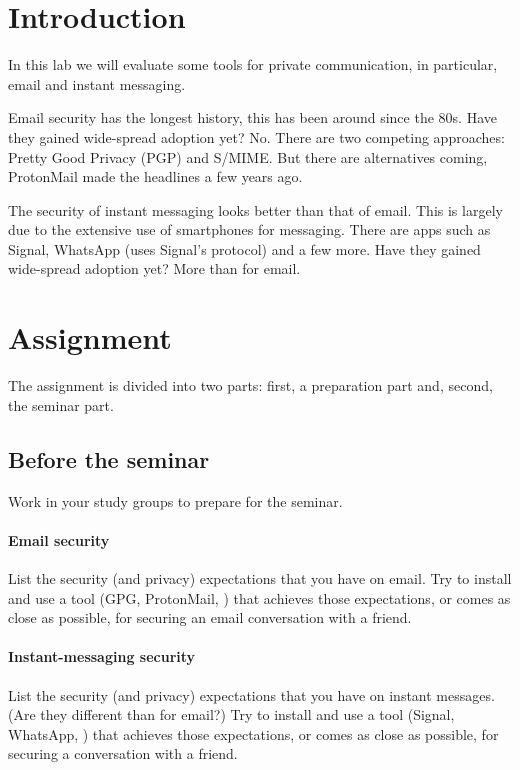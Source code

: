 \mode*

\section{Introduction}%
\label{Introduction}

In this lab we will evaluate some tools for private communication, in 
particular, email and instant messaging.

Email security has the longest history, this has been around since the 80s.
Have they gained wide-spread adoption yet?
No.
There are two competing approaches: Pretty Good Privacy (PGP) and S/MIME.
But there are alternatives coming, \eg ProtonMail made the headlines a few 
years ago.

The security of instant messaging looks better than that of email.
This is largely due to the extensive use of smartphones for messaging.
There are apps such as Signal, WhatsApp (uses Signal's protocol) and a few 
more.
Have they gained wide-spread adoption yet?
More than for email.


\section{Assignment}%
\label{sec:Tasks}

The assignment is divided into two parts: first, a preparation part and, 
second, the seminar part.

\subsection{Before the seminar}

Work in your study groups to prepare for the seminar.

\paragraph{Email security}

List the security (and privacy) expectations that you have on email.
Try to install and use a tool (\eg GPG, ProtonMail, \etc) that achieves those 
expectations, or comes as close as possible, for securing an email conversation 
with a friend.

\paragraph{Instant-messaging security}

List the security (and privacy) expectations that you have on instant messages.
(Are they different than for email?)
Try to install and use a tool (\eg Signal, WhatsApp, \etc) that achieves those 
expectations, or comes as close as possible, for securing a conversation with a 
friend.


